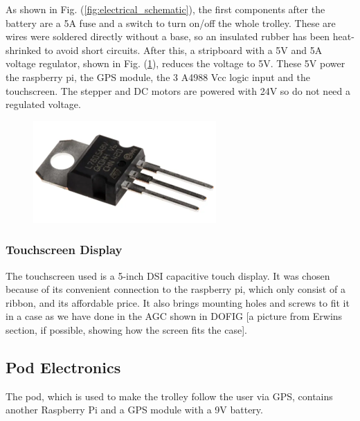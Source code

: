 \documentclass[11pt,landscape]{article}
\begin{document}
\begin{multicols}{3}
As shown in Fig. (\ref{fig:electrical_schematic}), the first components after
the battery are a 5A fuse and a switch to turn on/off the whole trolley. These
are wires were soldered directly without a base, so an insulated rubber has been
heat-shrinked to avoid short circuits. After this, a stripboard with a 5V and 5A
voltage regulator, shown in Fig. (\ref{fig:voltage_regulator}),
reduces the voltage to 5V. These 5V power the raspberry pi, the GPS module, the
3 A4988 Vcc logic input and the touchscreen. The stepper and DC motors are
powered with 24V so do not need a regulated voltage. 

\begin{figure}[H]
    \begin{center}
        \includegraphics[]{voltage_regulator}
        \label{fig:voltage_regulator}
        \end{center}
\end{figure}

\subsubsection{Touchscreen Display}
The touchscreen used is a 5-inch DSI capacitive touch display. It was chosen
because of its convenient connection to the raspberry pi, which only consist of
a ribbon, and its affordable price. It also brings mounting holes and screws to
fit it in a case as we have done in the AGC shown in DOFIG [a picture from Erwins
section, if possible, showing how the screen fits the case]. 

\subsection{Pod Electronics}
The pod, which is used to make the trolley follow the user via GPS, contains
another Raspberry Pi and a GPS module with a 9V battery.

\end{multicols}
\end{document}
